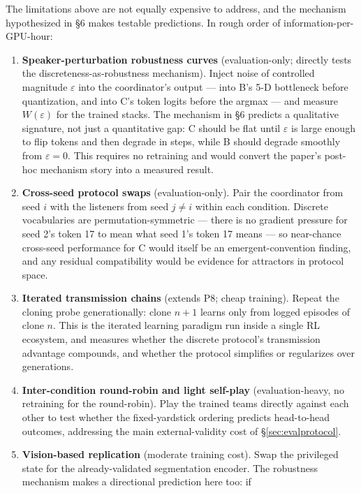 \documentclass[11pt]{article}
\begin{document}
The limitations above are not equally expensive to address, and the
mechanism hypothesized in \S6 makes testable predictions. In rough
order of information-per-GPU-hour:

\begin{enumerate}
\item \textbf{Speaker-perturbation robustness curves}
  (evaluation-only; directly tests the discreteness-as-robustness
  mechanism). Inject noise of controlled magnitude $\varepsilon$ into
  the coordinator's output --- into B's 5-D bottleneck before
  quantization, and into C's token logits before the argmax --- and
  measure $W(\varepsilon)$ for the trained stacks. The mechanism in \S6
  predicts a qualitative signature, not just a quantitative gap: C
  should be flat until $\varepsilon$ is large enough to flip tokens and
  then degrade in steps, while B should degrade smoothly from
  $\varepsilon = 0$. This requires no retraining and would convert the
  paper's post-hoc mechanism story into a measured result.
\item \textbf{Cross-seed protocol swaps} (evaluation-only). Pair the
  coordinator from seed $i$ with the listeners from seed $j \ne i$
  within each condition. Discrete vocabularies are permutation-symmetric
  --- there is no gradient pressure for seed 2's token 17 to mean what
  seed 1's token 17 means --- so near-chance cross-seed performance for
  C would itself be an emergent-convention finding, and any residual
  compatibility would be evidence for attractors in protocol space.
\item \textbf{Iterated transmission chains} (extends P8; cheap
  training). Repeat the cloning probe generationally: clone $n+1$
  learns only from logged episodes of clone $n$. This is the iterated
  learning paradigm \citep{kirby2001} run inside a single RL ecosystem,
  and measures whether the discrete protocol's transmission advantage
  compounds, and whether the protocol simplifies or regularizes over
  generations.
\item \textbf{Inter-condition round-robin and light self-play}
  (evaluation-heavy, no retraining for the round-robin). Play the
  trained teams directly against each other to test whether the
  fixed-yardstick ordering predicts head-to-head outcomes, addressing
  the main external-validity cost of \S\ref{sec:evalprotocol}.
\item \textbf{Vision-based replication} (moderate training cost). Swap
  the privileged state for the already-validated segmentation encoder.
  The robustness mechanism makes a directional prediction here too: if

\end{enumerate}
\end{document}
